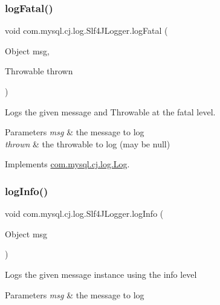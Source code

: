 \subsubsection{\texorpdfstring{log\+Fatal()}{logFatal()}\hspace{0.1cm}{\footnotesize\ttfamily [2/2]}}
{\footnotesize\ttfamily void com.\+mysql.\+cj.\+log.\+Slf4\+J\+Logger.\+log\+Fatal (\begin{DoxyParamCaption}\item[{Object}]{msg,  }\item[{Throwable}]{thrown }\end{DoxyParamCaption})}

Logs the given message and Throwable at the \textquotesingle{}fatal\textquotesingle{} level.


\begin{DoxyParams}{Parameters}
{\em msg} & the message to log \\
\hline
{\em thrown} & the throwable to log (may be null) \\
\hline
\end{DoxyParams}


Implements \mbox{\hyperlink{interfacecom_1_1mysql_1_1cj_1_1log_1_1_log_a54cd5e19bf210ab86b373400e2213229}{com.\+mysql.\+cj.\+log.\+Log}}.

\mbox{\label{classcom_1_1mysql_1_1cj_1_1log_1_1_slf4_j_logger_a3444f6e7cb48a80d3cf82acf93a74c27}} 
\subsubsection{\texorpdfstring{log\+Info()}{logInfo()}\hspace{0.1cm}{\footnotesize\ttfamily [1/2]}}
{\footnotesize\ttfamily void com.\+mysql.\+cj.\+log.\+Slf4\+J\+Logger.\+log\+Info (\begin{DoxyParamCaption}\item[{Object}]{msg }\end{DoxyParamCaption})}

Logs the given message instance using the \textquotesingle{}info\textquotesingle{} level


\begin{DoxyParams}{Parameters}
{\em msg} & the message to log \\
\hline
\end{DoxyParams}


